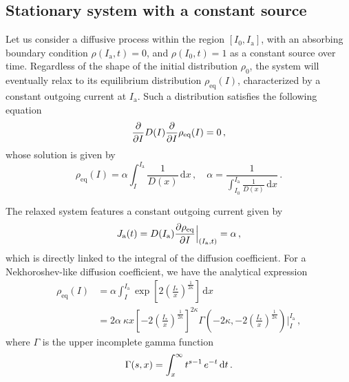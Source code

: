 
\subsection{Stationary system with a constant  source}\label{subsec:system_infinite_regime}


Let us consider a diffusive process within the region $[I_0, I_\mathrm{a}]$, with an absorbing boundary condition $\rho(I_\mathrm{a}, t) = 0$, and $\rho(I_0, t) = 1$ as a constant source over time. Regardless of the shape of the initial distribution $\rho_0$, the system will eventually relax to its equilibrium distribution $\rho_\text{eq}(I)$, characterized by a constant outgoing current at $I_\mathrm{a}$. Such a distribution satisfies the following equation
\begin{equation}
    \pdv{I} D(I) \pdv{I} \rho_{\text{eq}}(I) = 0 \,,
\end{equation}
whose solution is given by
\begin{equation}
    \rho_\text{eq}(I) = \alpha \int_I^{I_\mathrm{a}} \frac{1}{D(x)}\,\mathrm{d}x \,, \quad \alpha = \frac{1}{ \displaystyle{\int_{I_0}^{I_\mathrm{a}} \frac{1}{D(x)}\,\mathrm{d}x}} \, .
    \label{eq:equilibrium_stationary_distribution}
\end{equation}

The relaxed system features a constant outgoing current given by
\begin{equation}
    J_\mathrm{a}(t) = D(I_\mathrm{a})\pdv{\rho_\text{eq}}{I}\Bigr|_{(I_\mathrm{a},t)} = \alpha\,,
    \label{eq:equilibrium_stationary_current}
\end{equation} 
which is directly linked to the integral of the diffusion coefficient. For a Nekhoroshev-like diffusion coefficient, we have the analytical expression
\begin{equation}
    \begin{aligned}
        \rho_\text{eq}(I) &= \alpha \int_I^{I_\mathrm{a}} \exp\left[2\left(\frac{I_\ast}{x}\right)^{\frac{1}{2\kappa}}\right] \,\mathrm{d}x \\
        &= 2\alpha\ \kappa x \left[-2\left(\frac{I_\ast}{x}\right)^{\frac{1}{2\kappa}}\right]^{2\kappa} \Gamma\left(-2\kappa, -2\left(\frac{I_\ast}{x}\right)^{\frac{1}{2\kappa}}\right)\Bigg|_I^{I_\mathrm{a}}\,,
    \end{aligned}
\end{equation}
where $\Gamma$ is the upper incomplete gamma function
\begin{equation}
    \Gamma(s,x) = \int_x^{\infty} t^{s-1}\,e^{-t}\,{\rm d}t \,.
\end{equation}

